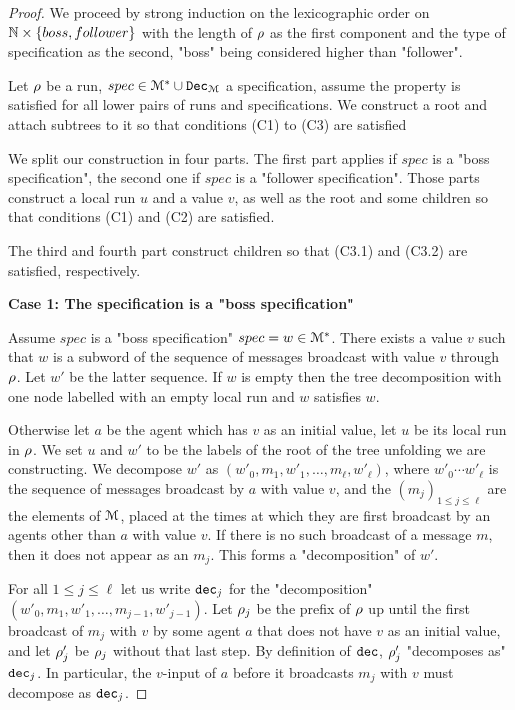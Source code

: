 \begin{proof}
	
	We proceed by strong induction on the lexicographic order on $\mathbb{N} \times \{boss, follower\}$ with the length of $\rho$ as the first component and the type of specification as the second, "boss" being considered higher than "follower". 
	
	Let $\rho$ be a run, $spec \in \mathcal{M}^* \cup \mathtt{Dec}_{\mathcal{M}}$ a specification, assume the property is satisfied for all lower pairs of runs and specifications. We construct a root and attach subtrees to it so that conditions (C1) to (C3) are satisfied 
	
	We split our construction in four parts. The first part applies if $spec$ is a "boss specification", the second one if $spec$ is a "follower specification". 
	Those parts construct a local run $u$ and a value $v$, as well as the root and some children so that conditions (C1) and (C2) are satisfied.
	
	The third and fourth part construct children so that (C3.1) and (C3.2) are satisfied, respectively.
	
	\textbf{Case 1: The specification is a "boss specification"}
	
	Assume $spec$ is a "boss specification" $spec = w \in \mathcal{M}^*$.
	There exists a value $v$ such that $w$ is a subword of the sequence of messages broadcast with value $v$ through $\rho$. Let $w'$ be the latter sequence.
	If $w$ is empty then the tree decomposition with one node labelled with an empty local run and $w$ satisfies $w$.	
	
	Otherwise let $a$ be the agent which has $v$ as an initial value, let $u$ be its local run in $\rho$. We set $u$ and $w'$ to be the labels of the root of the tree unfolding we are constructing.
	We decompose $w'$ as $(w'_0, m_1, w'_1, \ldots, m_\ell, w'_\ell)$, where $w'_0\cdots w'_\ell$ is the sequence of messages broadcast by $a$ with value $v$, and the $(m_j)_{1\leq j\leq \ell}$ are the elements of $\mathcal{M}$, placed at the times at which they are first broadcast by an agents other than $a$ with value $v$. If there is no such broadcast of a message $m$, then it does not appear as an $m_j$. This forms a "decomposition" of $w'$.
		
	For all $1 \leq j \leq \ell$ let us write $\mathtt{dec}_j$ for the "decomposition" $(w'_0, m_1, w'_1, \ldots, m_{j-1}, w'_{j-1})$. Let $\rho_j$ be the prefix of $\rho$ up until the first broadcast of $m_j$ with $v$ by some agent $a$ that does not have $v$ as an initial value, and let $\rho'_j$ be $\rho_j$ without that last step. By definition of $\mathtt{dec}$, $\rho'_j$ "decomposes as" $\mathtt{dec}_j$.
	In particular, the $v$-input of $a$ before it broadcasts $m_j$ with $v$ must decompose as $\mathtt{dec}_j$.
	 

\end{proof}
